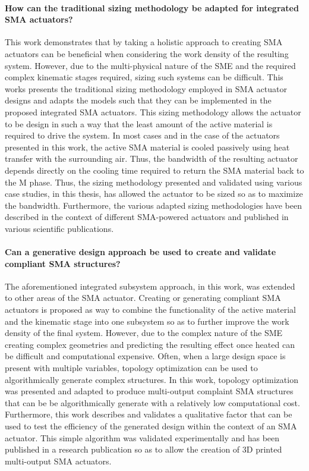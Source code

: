 \paragraph{How can the traditional sizing methodology be adapted for integrated SMA actuators?}
This work demonstrates that by taking a holistic approach to creating SMA actuators can be beneficial when considering the work density of the resulting system. However, due to the multi-physical nature of the SME and the required complex kinematic stages required, sizing such systems can be difficult. This works presents the traditional sizing methodology employed in SMA actuator designs and adapts the models such that they can be implemented in the proposed integrated SMA actuators. This sizing methodology allows the actuator to be design in such a way that the least amount of the active material is required to drive the system. In most cases and in the case of the actuators presented in this work, the active SMA material is cooled passively using heat transfer with the surrounding air. Thus, the bandwidth of the resulting actuator depends directly on the cooling time required to return the SMA material back to the M phase. Thus, the sizing methodology presented and validated using various case studies, in this thesis, has allowed the actuator to be sized so as to maximize the bandwidth. Furthermore, the various adapted sizing methodologies have been described in the context of different SMA-powered actuators and published in various scientific publications.

\paragraph{Can a generative design approach be used to create and validate compliant SMA structures?}
The aforementioned integrated subsystem approach, in this work, was extended to other areas of the SMA actuator. Creating or generating compliant SMA actuators is proposed as way to combine the functionality of the active material and the kinematic stage into one subsystem so as to further improve the work density of the final system. However, due to the complex nature of the SME creating complex geometries and predicting the resulting effect once heated can be difficult and computational expensive. Often, when a large design space is present with multiple variables, topology optimization can be used to algorithmically generate complex structures. In this work, topology optimization was presented and adapted to produce multi-output complaint SMA structures that can be be algorithmically generate with a relatively low computational cost. Furthermore, this work describes and validates a qualitative factor that can be used to test the efficiency of the generated design within the context of an SMA actuator. This simple algorithm was validated experimentally and has been published in a research publication so as to allow the creation of 3D printed multi-output SMA actuators.

